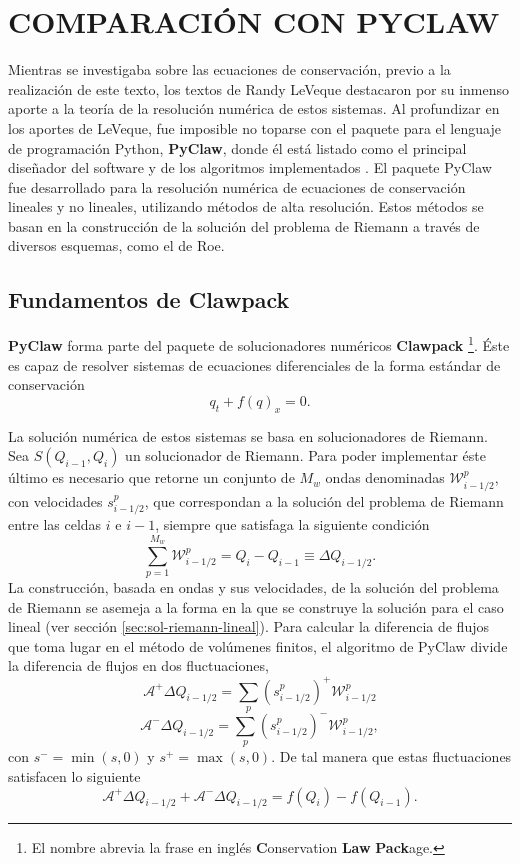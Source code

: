 \chapter{COMPARACIÓN CON PYCLAW}
Mientras se investigaba sobre las ecuaciones de conservación, previo a la realización de este texto, los textos de Randy LeVeque destacaron por su inmenso aporte a la teoría de la resolución numérica de estos sistemas. Al profundizar en los aportes de LeVeque, fue imposible no toparse con el paquete para el lenguaje de programación Python, \textbf{PyClaw}, donde él está listado como el principal diseñador del software y de los algoritmos implementados \cite{clawpack}. El paquete PyClaw fue desarrollado para la resolución numérica de ecuaciones de conservación lineales y no lineales, utilizando métodos de alta resolución. Estos métodos se basan en la construcción de la solución del problema de Riemann a través de diversos esquemas, como el de Roe.
\section{Fundamentos de Clawpack}
\textbf{PyClaw} forma parte del paquete de solucionadores numéricos \textbf{Clawpack} \footnote{El nombre abrevia la frase en inglés \textbf{C}onservation \textbf{Law} \textbf{Pack}age.}. Éste es capaz de resolver sistemas de ecuaciones diferenciales de la forma estándar de conservación
\begin{equation}
	q_t + f(q)_x = 0.
\end{equation}

La solución numérica de estos sistemas se basa en solucionadores de Riemann. Sea $S(Q_{i-1}, Q_{i})$ un solucionador de Riemann. Para poder implementar éste último es necesario que retorne un conjunto de $M_{w}$ ondas denominadas $\mathcal{W}_{i-1/2}^{p}$, con velocidades $s_{i-1/2}^{p}$, que correspondan a la solución del problema de Riemann entre las celdas $i$ e $i-1$, siempre que satisfaga la siguiente condición
\begin{equation}
	\sum_{p=1}^{M_{w}}\mathcal{W}_{i-1/2}^{p} = Q_i - Q_{i-1} \equiv \Delta Q_{i-1/2}.
\end{equation}
La construcción, basada en ondas y sus velocidades, de la solución del problema de Riemann se asemeja a la forma en la que se construye la solución para el caso lineal (ver sección \ref{sec:sol-riemann-lineal}). Para calcular la diferencia de flujos que toma lugar en el método de volúmenes finitos, el algoritmo de PyClaw divide la diferencia de flujos en dos fluctuaciones,
\begin{equation}
	\mathcal{A}^{+}\Delta Q_{i-1/2} = \sum_{p}(s_{i-1/2}^{p})^{+}\mathcal{W}_{i-1/2}^{p}
\end{equation}
\begin{equation}
	\mathcal{A}^{-}\Delta Q_{i-1/2} = \sum_{p}(s_{i-1/2}^{p})^{-}\mathcal{W}_{i-1/2}^{p},
\end{equation}
con $s^{-} = \min(s,0)$ y $s^{+} = \max(s,0)$. De tal manera que estas fluctuaciones satisfacen lo siguiente
\begin{equation}
	\mathcal{A}^{+}\Delta Q_{i-1/2} + \mathcal{A}^{-}\Delta Q_{i-1/2} = f(Q_{i})-f(Q_{i-1}).
\end{equation}

